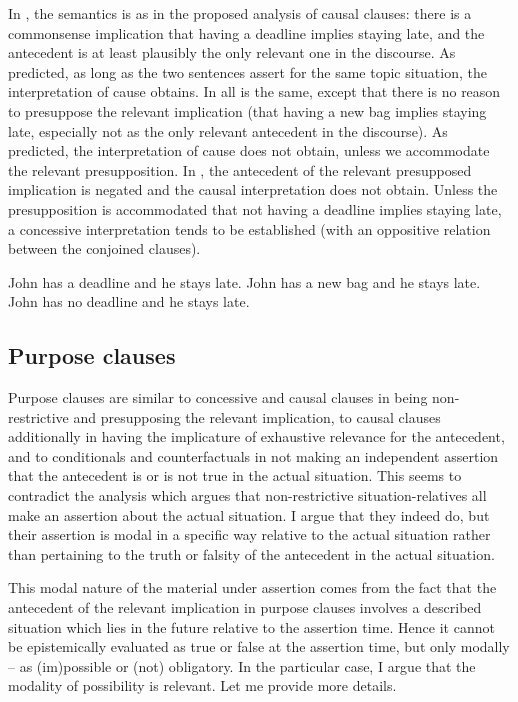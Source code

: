 \documentclass[output=paper]{langscibook}
\begin{document}
In , the semantics is as in the proposed analysis of causal clauses: there is a commonsense implication that having a deadline implies staying late, and the antecedent is at least plausibly the only relevant one in the discourse. As predicted, as long as the two sentences assert for the same topic situation, the interpretation of cause obtains. In  all is the same, except that there is no reason to presuppose the relevant implication (that having a new bag implies staying late, especially not as the only relevant antecedent in the discourse). As predicted, the interpretation of cause does not obtain, unless we accommodate the relevant presupposition. In , the antecedent of the relevant presupposed implication is negated and the causal interpretation does not obtain. Unless the presupposition is accommodated that not having a deadline implies staying late, a concessive interpretation tends to be established (with an oppositive relation between the conjoined clauses).

\ea\label{ex:CausTest}
\ea John has a deadline and he stays late.\label{ex:CausTest-a}
\ex John has a new bag and he stays late.\label{ex:CausTest-b}
\ex John has no deadline and he stays late.\label{ex:CausTest-c}
\z\z

\subsection{Purpose clauses}

Purpose clauses are similar to concessive and causal clauses in being non-restric\-tive and presupposing the relevant implication, to causal clauses additionally in having the implicature of exhaustive relevance for the antecedent, and to conditionals and counterfactuals in not making an independent assertion that the antecedent is or is not true in the actual situation. This seems to contradict the analysis which argues that non-restrictive situation-relatives all make an assertion about the actual situation. I argue that they indeed do, but their assertion is modal in a specific way relative to the actual situation rather than pertaining to the truth or falsity of the antecedent in the actual situation.

This modal nature of the material under assertion comes from the fact that the antecedent of the relevant implication in purpose clauses involves a described situation which lies in the future relative to the assertion time. Hence it cannot be epistemically evaluated as true or false at the assertion time, but only modally -- as (im)possible or (not) obligatory. In the particular case, I argue that the modality of possibility is relevant. Let me provide more details.
\end{document}
